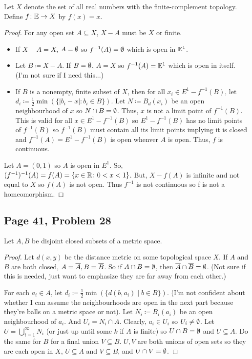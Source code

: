 Let $X$ denote the set of all real numbers with the finite-complement topology. Define $f\colon \mathbb{E}\to X$ by $f(x) = x$.

\begin{proof}
    For any open set $A \subseteq X$, $X-A$ must be $X$ or finite. 
    \begin{itemize}
        \item If $X-A =X$, $A = \emptyset$ so $f^{-1}(A) = \emptyset$ which is open in $\mathbb{E}^1$.
        \item Let $B \coloneq X-A$. If $B = \emptyset$, $A=X$ so $f^{-1}(A) = \mathbb{E}^1$ which is open in itself. (I'm not sure if I need this...)
        \item If $B$ is a nonempty, finite subset of $X$, then for all $x_i \in E^1 - f^{-1}(B)$, let $d_i \coloneq \frac{1}{2}\min(\{\left| b_i - x\right| \colon b_i \in B\})$. Let $N \coloneq B_d(x_i)$ be an open neighbourhood of $x$ so $N\cap B = \emptyset$. Thus, $x$ is not a limit point of $f^{-1}(B)$. This is valid for all $x \in E^1 - f^{-1}(B)$ so $E^1 - f^{-1}(B)$ has no limit points of $f^{-1}(B)$ so $f^{-1}(B)$ must contain all its limit points implying it is closed and $f^{-1}(A) = E^1 - f^{-1}(B)$ is open whenver $A$ is open. Thus, $f$ is continuous.
    \end{itemize}

    Let $A = (0,1)$ so $A$ is open in $E^1$. So, $(f^{-1})^{-1}(A) = f(A) = \{x \in \mathbb{R} \colon 0 < x < 1\}$. But, $X - f(A)$ is infinite and not equal to $X$ so $f(A)$ is not open. Thus $f^{-1}$ is not continuous so f is not a homeomorphism.
\end{proof}

\subsection*{Page 41, Problem 28}

Let $A,B$ be disjoint closed subsets of a metric space.

\begin{proof}
    Let $d(x,y)$ be the distance metric on some topological space $X$. If $A$ and $B$ are both closed, $A = \overline{A}, B = \overline{B}$. So if $A \cap B = \emptyset$, then $\overline{A}\cap\overline{B}=\emptyset$. (Not sure if this is needed, just want to emphasize they are far away from each other.)
    
    For each $a_i \in A$, let $d_i \coloneq \frac{1}{2}\min(\{d(b,a_i) \mid b \in B\})$. (I'm not confident about whether I can assume the neighbourhoods are open in the next part because they're balls on a metric space or not). Let $N_i \coloneq B_i(a_i)$ be an open neighbourhood of $a_i$. And $U_i = N_i \cap A$. Clearly, $a_i \in U_i$ so $U_i \neq \emptyset$. Let $U = \bigcup_{i=1}^{\infty}N_i$ (or just up until some $k$ if $A$ is finite) so $U\cap B = \emptyset$ and $U \subseteq A$. Do the same for $B$ for a final union $V \subseteq B$. $U, V$ are both unions of open sets so they are each open in $X$, $U \subseteq A$ and $V \subseteq B$, and $U \cap V = \emptyset$.
\end{proof}
